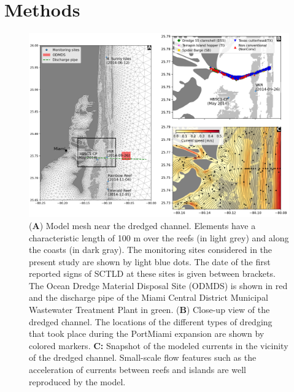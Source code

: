 \documentclass[preprint,12pt,authoryear]{elsarticle}
\newcommand{\modif}[1]{\textcolor{blue}{#1}}
\begin{document}

\section{Methods}

\begin{figure}
	\centering
	\includegraphics[width=\textwidth]{figures/fig_mesh_new.png}
	\caption{(\textbf{A}) Model mesh near the dredged channel. Elements have a characteristic length of 100 m over the reefs (in light grey) and along the coasts (in dark gray). The monitoring sites considered in the present study are shown by light blue dots. The date of the first reported signs of SCTLD at these sites is given between brackets. The Ocean Dredge Material Disposal Site (ODMDS) is shown in red and the discharge pipe of the Miami Central District Municipal Wastewater Treatment Plant in green. (\textbf{B}) Close-up view of the dredged channel. The locations of the different types of dredging that took place during the PortMiami expansion are shown by colored markers. \textbf{C:} Snapshot of the modeled currents in the vicinity of the dredged channel. Small-scale flow features such as the acceleration of currents between reefs and islands are well reproduced by the model.}
	\label{fig:onset_mesh}
\end{figure}
\end{document}
